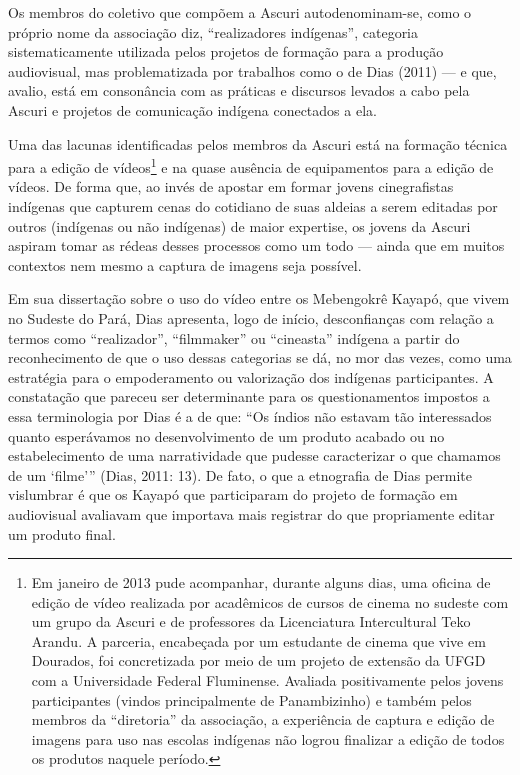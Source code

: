 \documentclass{article}
\begin{document}
Os membros do coletivo que comp\~oem a Ascuri autodenominam-se, como o
pr\'oprio nome da associa\c{c}\~ao diz, {\textquotedblleft}realizadores
ind\'igenas{\textquotedblright}, categoria sistematicamente utilizada
pelos projetos de forma\c{c}\~ao para a produ\c{c}\~ao audiovisual, mas
problematizada por trabalhos como o de Dias (2011) --- e que, avalio,
est\'a em conson\^ancia com as pr\'aticas e discursos levados a cabo
pela Ascuri e projetos de comunica\c{c}\~ao ind\'igena conectados a
ela.

Uma das lacunas identificadas pelos membros da Ascuri est\'a na
forma\c{c}\~ao t\'ecnica para a edi\c{c}\~ao de v\'ideos\footnote{ Em
janeiro de 2013 pude acompanhar, durante alguns dias, uma oficina de
edi\c{c}\~ao de v\'ideo realizada por acad\^emicos de cursos de cinema
no sudeste com um grupo da Ascuri e de professores da Licenciatura
Intercultural Teko Arandu. A parceria, encabe\c{c}ada por um estudante
de cinema que vive em Dourados, foi concretizada por meio de um projeto
de extens\~ao da UFGD com a Universidade Federal Fluminense. Avaliada
positivamente pelos jovens participantes (vindos principalmente de
Panambizinho) e tamb\'em pelos membros da
{\textquotedblleft}diretoria{\textquotedblright} da associa\c{c}\~ao, a
experi\^encia de captura e edi\c{c}\~ao de imagens para uso nas escolas
ind\'igenas n\~ao logrou finalizar a edi\c{c}\~ao de todos os produtos
naquele per\'iodo. } e na quase aus\^encia de equipamentos para a
edi\c{c}\~ao de v\'ideos. De forma que, ao inv\'es de apostar em formar
jovens cinegrafistas ind\'igenas que capturem cenas do cotidiano de
suas aldeias a serem editadas por outros (ind\'igenas ou n\~ao
ind\'igenas) de maior expertise, os jovens da Ascuri aspiram tomar as
r\'edeas desses processos como um todo --- ainda que em muitos
contextos nem mesmo a captura de imagens seja poss\'ivel.

Em sua disserta\c{c}\~ao sobre o uso do v\'ideo entre os Mebengokr\^e
Kayap\'o, que vivem no Sudeste do Par\'a, Dias apresenta, logo de
in\'icio, desconfian\c{c}as com rela\c{c}\~ao a termos como
{\textquotedblleft}realizador{\textquotedblright},
{\textquotedblleft}filmmaker{\textquotedblright} ou
{\textquotedblleft}cineasta{\textquotedblright} ind\'igena a partir do
reconhecimento de que o uso dessas categorias se d\'a, no mor das
vezes, como uma estrat\'egia para o empoderamento ou valoriza\c{c}\~ao
dos ind\'igenas participantes. A constata\c{c}\~ao que pareceu ser
determinante para os questionamentos impostos a essa terminologia por
Dias \'e a de que: {\textquotedblleft}Os \'indios n\~ao estavam t\~ao
interessados quanto esper\'avamos no desenvolvimento de um produto
acabado ou no estabelecimento de uma narratividade que pudesse
caracterizar o que chamamos de um
{\textquoteleft}filme{\textquoteright}{\textquotedblright} (Dias, 2011:
13). De fato, o que a etnografia de Dias permite vislumbrar \'e que os
Kayap\'o que participaram do projeto de forma\c{c}\~ao em audiovisual
avaliavam que importava mais registrar do que propriamente editar um
produto final.
\end{document}
